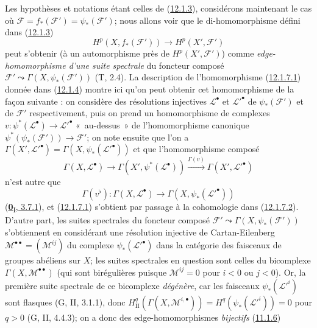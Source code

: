 \begin{env}[12.1.7]
\label{0.12.1.7-fr}
Les hypothèses et notations étant celles de
(\hyperref[0.12.1.3-fr]{12.1.3}), considérons maintenant le cas où
$\mathcal F=f_*(\mathcal F')=\psi_*(\mathcal F')$; nous allons voir que le
di-homomorphisme défini dans (\hyperref[0.12.1.3-fr]{12.1.3})
\[
\label{0.12.1.7.1-fr}
\tag{12.1.7.1}
H^p(X,f_*(\mathcal F'))\longrightarrow H^p(X',\mathcal F')
\]
peut s'obtenir (à un automorphisme près de $H^p(X',\mathcal F')$) comme
\emph{edge-homomorphisme d'une suite spectrale} du foncteur composé
$\mathcal F'\leadsto\Gamma(X,\psi_*(\mathcal F'))$ (T, 2.4). La description
de l'homomorphisme (\hyperref[0.12.1.7.1-fr]{12.1.7.1}) donnée dans
(\hyperref[0.12.1.4-fr]{12.1.4}) montre ici qu'on peut obtenir cet
homomorphisme de la façon suivante : on considère des résolutions injectives
$\mathcal L^\bullet$ et $\mathcal L'^\bullet$ de $\psi_*(\mathcal F')$ et de
$\mathcal F'$ respectivement, puis on prend un homomorphisme de complexes
$v:\psi^*(\mathcal L^\bullet)\to\mathcal L'^\bullet$ «~au-dessus~» de
l'homomorphisme canonique $\psi^*(\psi_*(\mathcal F'))\to\mathcal F'$;
on note ensuite que l'on a
$\Gamma(X',\mathcal L'^\bullet)=\Gamma(X,\psi_*(\mathcal L'^\bullet))$ et
que l'homomorphisme composé
\[
\Gamma(X,\mathcal L^\bullet)\longrightarrow
\Gamma(X',\psi^*(\mathcal L^\bullet))
\xrightarrow{\Gamma(v)}\Gamma(X',\mathcal L'^\bullet)
\]
n'est autre que
\[
\label{0.12.1.7.2-fr}
\tag{12.1.7.2}
\Gamma(v^\flat):\Gamma(X,\mathcal L^\bullet)
\longrightarrow\Gamma(X,\psi_*(\mathcal L'^\bullet))
\]
(\hyperref[0.3.7.1-fr]{\textbf{0}\textsubscript{I}, 3.7.1}), et
(\hyperref[0.12.1.7.1-fr]{12.1.7.1}) s'obtient par passage à la cohomologie
dans (\hyperref[0.12.1.7.2-fr]{12.1.7.2}). D'autre part, les suites spectrales
du foncteur composé $\mathcal F'\leadsto\Gamma(X,\psi_*(\mathcal F'))$
s'obtiennent en considérant une résolution injective de Cartan-Eilenberg
$\mathcal M^{\bullet\bullet}=(\mathcal M^{ij})$ du complexe
$\psi_*(\mathcal L'^\bullet)$ dans la catégorie des faisceaux de groupes
abéliens sur $X$; les suites spectrales en question sont celles du bicomplexe
$\Gamma(X,\mathcal M^{\bullet\bullet})$ (qui sont birégulières puisque
$\mathcal M^{ij}=0$ pour $i<0$ ou $j<0$). Or, la première suite spectrale de
ce bicomplexe \emph{dégénère}, car les faisceaux
$\psi_*(\mathcal L'^i)$ sont flasques (G, II, 3.1.1), donc
$H_{\mathrm{II}}^q(\Gamma(X,\mathcal M^{i,\bullet}))
=H^q(\psi_*(\mathcal L'^i))=0$ pour $q>0$ (G, II, 4.4.3); on a donc des
edge-homomorphismes \emph{bijectifs} (\hyperref[0.11.1.6-fr]{11.1.6})

\end{env}
